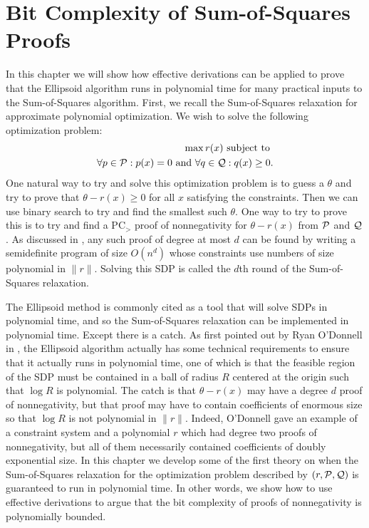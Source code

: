 \chapter{Bit Complexity of Sum-of-Squares Proofs}\label{cha:bit_complexity}
In this chapter we will show how effective derivations can be applied to prove that the Ellipsoid algorithm runs in polynomial time for many practical inputs to the Sum-of-Squares algorithm. First, we recall the Sum-of-Squares relaxation for approximate polynomial optimization. We wish to solve the following optimization problem:
\begin{align*}
\max r(x)\text{ subject to } \\
\forall p \in \mathcal P: p(x) = 0 \text{ and } \forall q \in \mathcal Q: q(x) \geq 0.
\end{align*}
One natural way to try and solve this optimization problem is to guess a $\theta$ and try to prove that $\theta - r(x) \geq 0$ for all $x$ satisfying the constraints. Then we can use binary search to try and find the smallest such $\theta$. One way to try to prove this is to try and find a PC$_>$ proof of nonnegativity for $\theta - r(x)$ from $\mathcal P$ and $\mathcal Q$. As discussed in , any such proof of degree at most $d$ can be found by writing a semidefinite program of size $O(n^d)$ whose constraints use numbers of size polynomial in $\|r\|$. Solving this SDP is called the $d$th round of the Sum-of-Squares relaxation. 

The Ellipsoid method is commonly cited as a tool that will solve SDPs in polynomial time, and so the Sum-of-Squares relaxation can be implemented in polynomial time. Except there is a catch. As first pointed out by Ryan O'Donnell in \cite{}, the Ellipsoid algorithm actually has some technical requirements to ensure that it actually runs in polynomial time, one of which is that the feasible region of the SDP must be contained in a ball of radius $R$ centered at the origin such that $\log R$ is polynomial. The catch is that $\theta - r(x)$ may have a degree $d$ proof of nonnegativity, but that proof may have to contain coefficients of enormous size so that $\log R$ is not polynomial in $\|r\|$. Indeed, O'Donnell gave an example of a constraint system and a polynomial $r$ which had degree two proofs of nonnegativity, but all of them necessarily contained coefficients of doubly exponential size. In this chapter we develop some of the first theory on when the Sum-of-Squares relaxation for the optimization problem described by $(r, \mathcal P,\mathcal Q)$ is guaranteed to run in polynomial time. In other words, we show how to use effective derivations to argue that the bit complexity of proofs of nonnegativity is polynomially bounded. 


